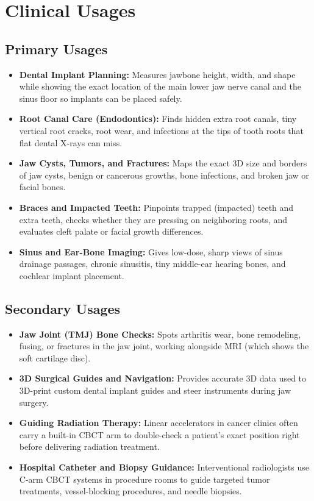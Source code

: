 \section{Clinical Usages}

\subsection{Primary Usages}
\begin{itemize}
    \item \textbf{Dental Implant Planning:} Measures jawbone height, width, and shape while showing the exact location of the main lower jaw nerve canal and the sinus floor so implants can be placed safely.
    \item \textbf{Root Canal Care (Endodontics):} Finds hidden extra root canals, tiny vertical root cracks, root wear, and infections at the tips of tooth roots that flat dental X-rays can miss.
    \item \textbf{Jaw Cysts, Tumors, and Fractures:} Maps the exact 3D size and borders of jaw cysts, benign or cancerous growths, bone infections, and broken jaw or facial bones.
    \item \textbf{Braces and Impacted Teeth:} Pinpoints trapped (impacted) teeth and extra teeth, checks whether they are pressing on neighboring roots, and evaluates cleft palate or facial growth differences.
    \item \textbf{Sinus and Ear-Bone Imaging:} Gives low-dose, sharp views of sinus drainage passages, chronic sinusitis, tiny middle-ear hearing bones, and cochlear implant placement.
\end{itemize}

\subsection{Secondary Usages}
\begin{itemize}
    \item \textbf{Jaw Joint (TMJ) Bone Checks:} Spots arthritis wear, bone remodeling, fusing, or fractures in the jaw joint, working alongside MRI (which shows the soft cartilage disc).
    \item \textbf{3D Surgical Guides and Navigation:} Provides accurate 3D data used to 3D-print custom dental implant guides and steer instruments during jaw surgery.
    \item \textbf{Guiding Radiation Therapy:} Linear accelerators in cancer clinics often carry a built-in CBCT arm to double-check a patient's exact position right before delivering radiation treatment.
    \item \textbf{Hospital Catheter and Biopsy Guidance:} Interventional radiologists use C-arm CBCT systems in procedure rooms to guide targeted tumor treatments, vessel-blocking procedures, and needle biopsies.
\end{itemize}

